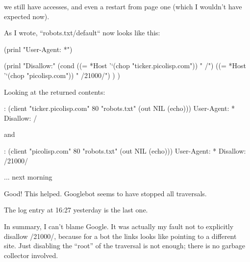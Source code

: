 we still have accesses, and even a restart from page one (which I wouldn't have
expected now).

As I wrote, ``robots.txt/default`` now looks like this:
\begin{wideverbatim}
   (prinl "User-Agent: *")

   (prinl "Disallow:"
      (cond
         ((= *Host '`(chop "ticker.picolisp.com")) " /")
         ((= *Host '`(chop "picolisp.com")) " /21000/") ) )
\end{wideverbatim}

Looking at the returned contents:
\begin{wideverbatim}
   : (client "ticker.picolisp.com" 80 "robots.txt" (out NIL (echo)))
   User-Agent: *
   Disallow: /
\end{wideverbatim}

and
\begin{wideverbatim}
   : (client "picolisp.com" 80 "robots.txt" (out NIL (echo)))
   User-Agent: *
   Disallow: /21000/
\end{wideverbatim}


... next morning

Good! This helped. Googlebot seems to have stopped all traversals.

The log entry at 16:27 yesterday is the last one.

In summary, I can't blame Google. It was actually my fault not to explicitly
disallow /21000/, because for a bot the links looks like pointing to a different
site. Just disabling the ``root'' of the traversal is not enough; there is no
garbage collector involved.

